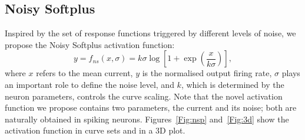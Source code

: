 %		
	

	

		
	\subsection{Noisy Softplus}
	Inspired by the set of response functions triggered by different levels of noise, we propose the Noisy Softplus activation function:
	\begin{equation}
	y = f_{ns}(x, \sigma) = k \sigma \log [1 + \exp(\frac{x}{k \sigma})],
	\label{equ:nsp}
	\end{equation}
	where $x$ refers to the mean current, $y$ is the normalised output firing rate, $\sigma$ plays an important role to define the noise level, and $k$, which is determined by the neuron parameters, controls the curve scaling.
	Note that the novel activation function we propose contains two parameters, the current and its noise; both are naturally obtained in spiking neurons.
	Figures~\ref{Fig:nsp} and~\ref{Fig:3d} show the activation function in curve sets and in a 3D plot.
